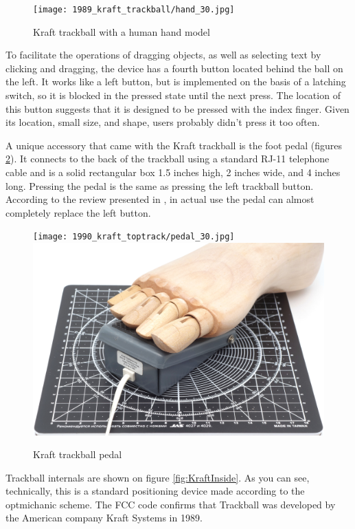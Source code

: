 \documentclass[11pt, a4paper]{article}
\begin{document}
\begin{figure}[h]
    \centering
    \texttt{[image: 1989\_kraft\_trackball/hand\_30.jpg]}
    \caption{Kraft trackball with a human hand model}
    \label{fig:KraftHand}
\end{figure}

To facilitate the operations of dragging objects, as well as selecting text by clicking and dragging, the device has a fourth button located behind the ball on the left. It works like a left button, but is implemented on the basis of a latching switch, so it is blocked in the pressed state until the next press. The location of this button suggests that it is designed to be pressed with the index finger. Given its location, small size, and shape, users probably didn't press it too often.

A unique accessory that came with the Kraft trackball is the foot pedal (figures \ref{fig:KraftPedal}). It connects to the back of the trackball using a standard RJ-11 telephone cable and is a solid rectangular box 1.5 inches high, 2 inches wide, and 4 inches long. Pressing the pedal is the same as pressing the left trackball button. According to the review presented in \cite{kraftwithpedal}, in actual use the pedal can almost completely replace the left button.

\begin{figure}[h]
    \centering
    \texttt{[image: 1990\_kraft\_toptrack/pedal\_30.jpg]} \hfill 
    \includegraphics[scale=0.22]{1990_kraft_toptrack/pedal_foot_30.jpg}
    \caption{Kraft trackball pedal}
    \label{fig:KraftPedal}
\end{figure}

Trackball internals are shown on figure \ref{fig:KraftInside}. As you can see, technically, this is a standard positioning device made according to the optmichanic scheme. The FCC code confirms that Trackball was developed by the American company Kraft Systems in 1989.
\end{document}
